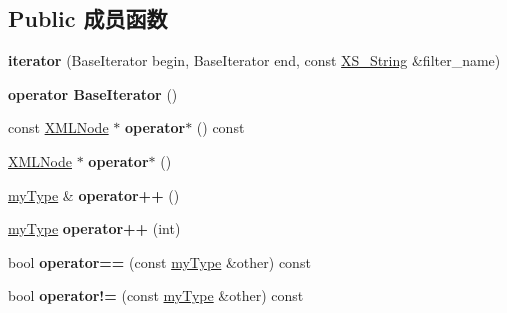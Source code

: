 \subsection*{Public 成员函数}
\begin{DoxyCompactItemize}
\item 
\mbox{\label{struct_x_m_l_storage_1_1_x_m_l_children_filter_1_1iterator_a686190f8a065c17b03816990c3a60e1a}} 
{\bfseries iterator} (Base\+Iterator begin, Base\+Iterator end, const \hyperlink{struct_x_m_l_storage_1_1_x_s___string}{X\+S\+\_\+\+String} \&filter\+\_\+name)
\item 
\mbox{\label{struct_x_m_l_storage_1_1_x_m_l_children_filter_1_1iterator_a32da6a7ef0a2208648c14d138e59f0b7}} 
{\bfseries operator Base\+Iterator} ()
\item 
\mbox{\label{struct_x_m_l_storage_1_1_x_m_l_children_filter_1_1iterator_a6ec9891041f2f2b9f159a9e2bd27efe2}} 
const \hyperlink{struct_x_m_l_storage_1_1_x_m_l_node}{X\+M\+L\+Node} $\ast$ {\bfseries operator$\ast$} () const
\item 
\mbox{\label{struct_x_m_l_storage_1_1_x_m_l_children_filter_1_1iterator_ab33099393d4baf1a6d1f5fbaaf02c956}} 
\hyperlink{struct_x_m_l_storage_1_1_x_m_l_node}{X\+M\+L\+Node} $\ast$ {\bfseries operator$\ast$} ()
\item 
\mbox{\label{struct_x_m_l_storage_1_1_x_m_l_children_filter_1_1iterator_a2c4e2cb59588ceac5085380c5ee30835}} 
\hyperlink{struct_x_m_l_storage_1_1_x_m_l_children_filter_1_1iterator}{my\+Type} \& {\bfseries operator++} ()
\item 
\mbox{\label{struct_x_m_l_storage_1_1_x_m_l_children_filter_1_1iterator_a1eb9ccf00460b176bee03f597edc6fff}} 
\hyperlink{struct_x_m_l_storage_1_1_x_m_l_children_filter_1_1iterator}{my\+Type} {\bfseries operator++} (int)
\item 
\mbox{\label{struct_x_m_l_storage_1_1_x_m_l_children_filter_1_1iterator_a3be394ca0202f3d56c83de25c45a96e4}} 
bool {\bfseries operator==} (const \hyperlink{struct_x_m_l_storage_1_1_x_m_l_children_filter_1_1iterator}{my\+Type} \&other) const
\item 
\mbox{\label{struct_x_m_l_storage_1_1_x_m_l_children_filter_1_1iterator_a8e1c41f034720809f96c0ba517cee266}} 
bool {\bfseries operator!=} (const \hyperlink{struct_x_m_l_storage_1_1_x_m_l_children_filter_1_1iterator}{my\+Type} \&other) const
\end{DoxyCompactItemize}
